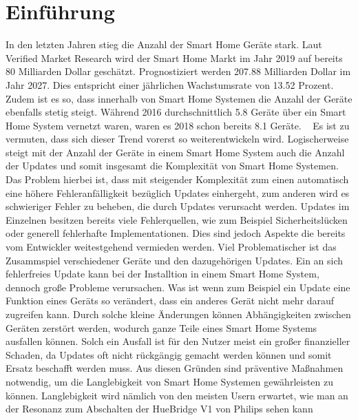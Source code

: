 \chapter{Einführung}

In den letzten Jahren stieg die Anzahl der Smart Home Geräte stark. Laut Verified Market Research wird
der Smart Home Markt im Jahr 2019 auf bereits 80 Milliarden Dollar geschätzt. Prognostiziert werden 207.88 
Milliarden Dollar im Jahr 2027. Dies entspricht einer jährlichen Wachstumsrate von 13.52 Prozent.
~\cite{https://www.verifiedmarketresearch.com/product/global-smart-home-market-size-and-forecast-to-2025/}
Zudem ist es so, dass innerhalb von Smart Home Systemen die Anzahl der Geräte ebenfalls stetig steigt. Während 2016
durchschnittlich 5.8 Geräte über ein Smart Home System vernetzt waren, waren es 2018 schon bereits 8.1 Geräte. 
~\cite{https://www.homeandsmart.de/} Es ist zu vermuten, dass sich dieser Trend vorerst so weiterentwickeln wird.
Logischerweise steigt mit der Anzahl der Geräte in einem Smart Home System auch die Anzahl der Updates und somit 
insgesamt die Komplexität von Smart Home Systemen. Das Problem hierbei ist, dass mit steigender Komplexität zum einen automatisch eine höhere
Fehleranfälligkeit bezüglich Updates einhergeht, zum anderen wird es schwieriger Fehler zu beheben,
die durch Updates verursacht werden. Updates im Einzelnen besitzen bereits viele Fehlerquellen, wie zum Beispiel Sicherheitslücken 
oder generell fehlerhafte Implementationen. Dies sind jedoch Aspekte die bereits vom Entwickler weitestgehend vermieden werden.
Viel Problematischer ist das Zusammspiel verschiedener Geräte und den dazugehörigen Updates. Ein an sich fehlerfreies Update
kann bei der Installtion in einem Smart Home System, dennoch große Probleme verursachen. Was ist wenn zum Beispiel ein Update eine Funktion
eines Geräts so verändert, dass ein anderes Gerät nicht mehr darauf zugreifen kann. Durch solche kleine Änderungen
können Abhängigkeiten zwischen Geräten zerstört werden, wodurch ganze Teile eines Smart Home Systems ausfallen
können. Solch ein Ausfall ist für den Nutzer meist ein großer finanzieller Schaden, da Updates oft nicht 
rückgängig gemacht werden können und somit Ersatz beschafft werden muss.
Aus diesen Gründen sind präventive Maßnahmen notwendig,  um die Langlebigkeit von Smart Home Systemen gewährleisten zu können.
Langlebigkeit wird nämlich von den meisten Usern erwartet, wie man an der Resonanz zum Abschalten der HueBridge V1 von Philips sehen kann 
~\cite{Paper [4]}






